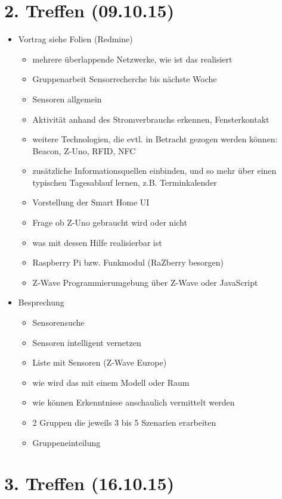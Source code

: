 \section{2. Treffen (09.10.15)}
\begin{itemize}
	\item Vortrag siehe Folien (Redmine)
	\begin{itemize}
		\item mehrere überlappende Netzwerke, wie ist das realisiert
		\item Gruppenarbeit Sensorrecherche bis nächste Woche
		\item Sensoren allgemein
		\item Aktivität anhand des Stromverbrauchs erkennen, Fensterkontakt
		\item weitere Technologien, die evtl. in Betracht gezogen werden können: Beacon, Z-Uno, RFID, NFC
		\item zusätzliche Informationsquellen einbinden, und so mehr über einen typischen Tagesablauf lernen, z.B. Terminkalender
		\item Vorstellung der Smart Home UI
		\item Frage ob Z-Uno gebraucht wird oder nicht
		\item was mit dessen Hilfe realisierbar ist
		\item Raspberry Pi bzw. Funkmodul (RaZberry besorgen)
		\item Z-Wave Programmierumgebung über Z-Wave oder JavaScript
	\end{itemize}
		
	\item Besprechung
	\begin{itemize}
		\item Sensorensuche
		\item Sensoren intelligent vernetzen
		\item Liste mit Sensoren (Z-Wave Europe)
		\item wie wird das mit einem Modell oder Raum
		\item wie können Erkenntnisse anschaulich vermittelt werden
		\item 2 Gruppen die jeweils 3 bis 5 Szenarien erarbeiten
		\item Gruppeneinteilung
	\end{itemize}
\end{itemize}
\section{3. Treffen (16.10.15)}


